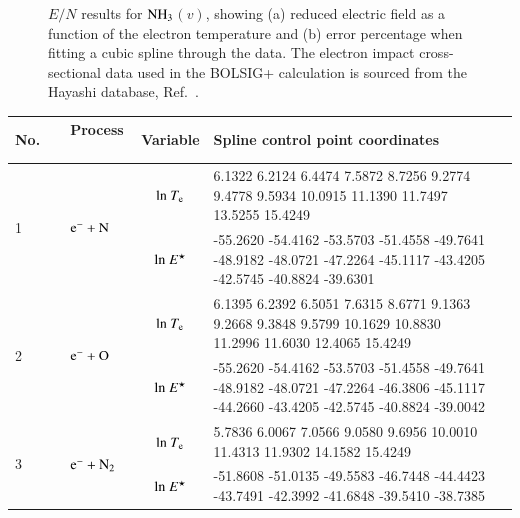 \begin{figure}[!htbp]
\caption{$E/N$ results for $\rm NH_3$$(v)$, showing (a) reduced electric field as a function of the electron temperature and (b) error percentage when fitting a cubic spline through the data. The electron impact cross-sectional data used in the BOLSIG+ calculation is sourced from the Hayashi database, Ref.\ \cite{springer:1987:hayashi}.}
\label{fig:electronimpact_NH3v}
\end{figure}
%



\begin{table}[!htbp]
  \center{}
  \begin{threeparttable}
    \label{tab:spline_tab}
    \begin{tabular*}{\textwidth}{l@{\extracolsep{\fill}}lcll}
    \toprule
   No.~~ & Process ~& Variable & Spline control point coordinates  \\
        \midrule

        

  \multirow{2}{*}{1} &  \multirow{2}{*}{ $\rm e^- + N  $   } & ${\rm ln}~T_{\rm e}$  & \tiny      6.1322    6.2124    6.4474    7.5872    8.7256    9.2774    9.4778    9.5934   10.0915   11.1390   11.7497   13.5255   15.4249
 \\
  &  & ${\rm ln}~E^\star$     & \tiny -55.2620  -54.4162  -53.5703  -51.4558  -49.7641  -48.9182  -48.0721  -47.2264  -45.1117  -43.4205  -42.5745  -40.8824  -39.6301\\     
  \midrule  
      
  \multirow{2}{*}{2} &  \multirow{2}{*}{ $\rm e^- + O  $   } & ${\rm ln}~T_{\rm e}$  & \tiny    6.1395    6.2392    6.5051    7.6315    8.6771    9.1363    9.2668    9.3848    9.5799   10.1629   10.8830   11.2996   11.6030   12.4065   15.4249 \\
  &  & ${\rm ln}~E^\star$     & \tiny  -55.2620  -54.4162  -53.5703  -51.4558  -49.7641  -48.9182  -48.0721  -47.2264  -46.3806  -45.1117  -44.2660  -43.4205  -42.5745  -40.8824  -39.0042\\     
  \midrule    
  
  \multirow{2}{*}{3} &  \multirow{2}{*}{ $\rm e^- + N_2 $   } & ${\rm ln}~T_{\rm e}$  & \tiny          5.7836    6.0067    7.0566    9.0580    9.6956   10.0010   11.4313   11.9302   14.1582   15.4249
\\
  &  & ${\rm ln}~E^\star$     & \tiny       -51.8608  -51.0135  -49.5583  -46.7448  -44.4423  -43.7491  -42.3992  -41.6848  -39.5410  -38.7385
\\
  \midrule  
  

\end{tabular*}
\end{threeparttable}
\end{table}
